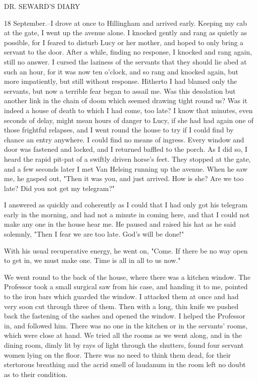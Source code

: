 DR. SEWARD'S DIARY 

18 September.--I drove at once to Hillingham and arrived early. Keeping my cab at the gate, I went up the avenue alone. I knocked gently and rang as quietly as possible, for I feared to disturb Lucy or her mother, and hoped to only bring a servant to the door. After a while, finding no response, I knocked and rang again, still no answer. I cursed the laziness of the servants that they should lie abed at such an hour, for it was now ten o'clock, and so rang and knocked again, but more impatiently, but still without response. Hitherto I had blamed only the servants, but now a terrible fear began to assail me. Was this desolation but another link in the chain of doom which seemed drawing tight round us? Was it indeed a house of death to which I had come, too late? I know that minutes, even seconds of delay, might mean hours of danger to Lucy, if she had had again one of those frightful relapses, and I went round the house to try if I could find by chance an entry anywhere. I could find no means of ingress. Every window and door was fastened and locked, and I returned baffled to the porch. As I did so, I heard the rapid pit-pat of a swiftly driven horse's feet. They stopped at the gate, and a few seconds later I met Van Helsing running up the avenue. When he saw me, he gasped out, "Then it was you, and just arrived. How is she? Are we too late? Did you not get my telegram?" 

I answered as quickly and coherently as I could that I had only got his telegram early in the morning, and had not a minute in coming here, and that I could not make any one in the house hear me. He paused and raised his hat as he said solemnly, "Then I fear we are too late. God's will be done!" 

With his usual recuperative energy, he went on, "Come. If there be no way open to get in, we must make one. Time is all in all to us now." 

We went round to the back of the house, where there was a kitchen window. The Professor took a small surgical saw from his case, and handing it to me, pointed to the iron bars which guarded the window. I attacked them at once and had very soon cut through three of them. Then with a long, thin knife we pushed back the fastening of the sashes and opened the window. I helped the Professor in, and followed him. There was no one in the kitchen or in the servants' rooms, which were close at hand. We tried all the rooms as we went along, and in the dining room, dimly lit by rays of light through the shutters, found four servant women lying on the floor. There was no need to think them dead, for their stertorous breathing and the acrid smell of laudanum in the room left no doubt as to their condition. 

